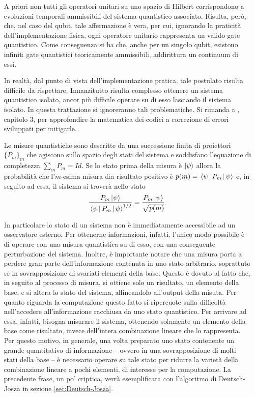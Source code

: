 A priori non tutti gli operatori unitari su uno spazio di Hilbert corrispondono a evoluzioni temporali ammissibili del sistema quantistico associato.
Risulta, però, che, nel caso del qubit, tale affermazione è vera, per cui, ignorando la praticità dell'implementazione fisica, ogni operatore unitario rappresenta un valido gate quantistico.
Come conseguenza si ha che, anche per un singolo qubit, esistono infiniti gate quantistici teoricamente ammissibili, addirittura un continuum di essi.

In realtà, dal punto di vista dell'implementazione pratica, tale postulato risulta difficile da rispettare.
Innanzitutto risulta complesso ottenere un sistema quantistico isolato, ancor più difficile operare su di esso lasciando il sistema isolato.
In questa trattazione si ignoreranno tali problematiche.
Si rimanda a \cite{Book:QCQI}, capitolo $3$, per approfondire la matematica dei codici a correzione di errori sviluppati per mitigarle.

\begin{post}\label{post:mq3}
 Le {\upshape misure quantistiche} sono descritte da una successione finita di proiettori $\{P_m\}_m$ che agiscono sullo spazio degli stati del sistema e soddisfano l'equazione di completezza $\sum_m P_m = Id$.
 Se lo stato prima della misura è $\ket{\psi}$ allora la probabilità che l'$m$-esima misura dia risultato positivo è $p(m) = \mel{\psi\,}{\, P_m \,}{\, \psi}$ e, in seguito ad essa, il sistema si troverà nello stato
 \begin{align*}
  \frac{P_m\ket{\psi}}{\mel{\psi\,}{\, P_m \,}{\, \psi}^{1/2}} = \frac{P_m\ket{\psi}}{\sqrt{p(m)}}.
 \end{align*}

\end{post}
In particolare lo stato di un sistema non è immediatamente accessibile ad un osservatore esterno.
Per ottenerne informazioni, infatti, l'unico modo possibile è di operare con una misura quantistica su di esso, con una conseguente perturbazione del sistema.
Inoltre, è importante notare che una misura porta a perdere gran parte dell'informazione contenuta in uno stato arbitrario, soprattuto se in sovrapposizione di svariati elementi della base.
Questo è dovuto al fatto che, in seguito al processo di misura, si ottiene solo un risultato, un elemento della base, e si altera lo stato del sistema, allineandolo all'output della misuta.
Per quanto riguarda la computazione questo fatto si ripercuote sulla difficoltà nell'accedere all'informazione racchiusa da uno stato quantistico.
Per arrivare ad essa, infatti, bisogna misurare il sistema, ottenendo solamente un elemento della base come risultato, invece dell'intera combinazione lineare che lo rappresenta.
Per questo motivo, in generale, una volta preparato uno stato contenente un grande quantitativo di informazione -- ovvero in una sovrapposizione di molti stati della base -- è necessario operare su tale stato per ridurre la varietà della combinazione lineare a pochi elementi, di interesse per la computazione.
La precedente frase, un po' criptica, verrà esemplificata con l'algoritmo di Deutsch-Josza in sezione \ref{sec:Deutsch-Josza}.

